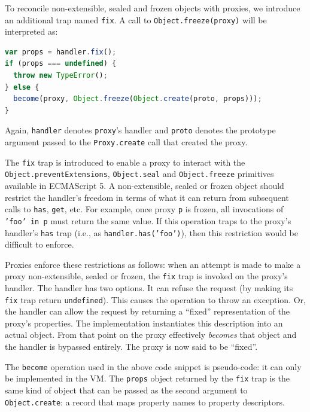 \documentclass{sig-alternate}
\begin{document}
To reconcile non-extensible, sealed and frozen objects with proxies, we introduce an additional trap named \texttt{fix}. A call to \texttt{Object.freeze(proxy)} will be interpreted as:

\begin{lstlisting}[language=javascript]
var props = handler.fix();
if (props === undefined) {
  throw new TypeError();
} else {
  become(proxy, Object.freeze(Object.create(proto, props)));
}
\end{lstlisting}

Again, \texttt{handler} denotes \texttt{proxy}'s handler and \texttt{proto} denotes the prototype argument passed to the \texttt{Proxy.create} call that created the proxy.

The \texttt{fix} trap is introduced to enable a proxy to interact with the \texttt{Object.preventExtensions}, \texttt{Object.seal} and \texttt{Object.freeze} primitives available in ECMAScript 5. A non-extensible, sealed or frozen object should restrict the handler's freedom in terms of what it can return from subsequent calls to \texttt{has}, \texttt{get}, etc. For example, once proxy \texttt{p} is frozen, all invocations of \texttt{'foo' in p} must return the same value. If this operation traps to the proxy's handler's \texttt{has} trap (i.e., as \texttt{handler.has('foo')}), then this restriction would be difficult to enforce.


Proxies enforce these restrictions as follows: when an attempt is made to make a proxy non-extensible, sealed or frozen, the \texttt{fix} trap is invoked on the proxy's handler. The handler has two options. It can refuse the request (by making its \texttt{fix} trap return \texttt{undefined}). This causes the operation to throw an exception. Or, the handler can allow the request by returning a ``fixed'' representation of the proxy's properties. The implementation instantiates this description into an actual object. From that point on the proxy effectively \emph{becomes} that object and the handler is bypassed entirely. The proxy is now said to be ``fixed''.

The \texttt{become} operation used in the above code snippet is pseudo-code: it can only be implemented in the VM. The \texttt{props} object returned by the \texttt{fix} trap is the same kind of object that can be passed as the second argument to \texttt{Object.create}: a record that maps property names to property descriptors.
\end{document}
